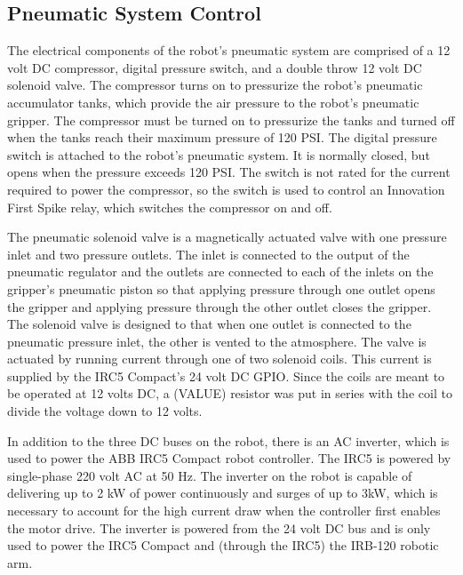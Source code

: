 \documentclass{cwru}
\begin{document}
\subsection[Pneumatic System Control]{Pneumatic System Control}
The electrical components of the robot{\textquoteright}s pneumatic system are comprised of a 12 volt DC compressor, digital pressure switch, and a double throw 12 volt DC solenoid valve. The compressor turns on to pressurize the robot{\textquoteright}s pneumatic accumulator tanks, which provide the air pressure to the robot{\textquoteright}s pneumatic gripper. The compressor must be turned on to pressurize the tanks and turned off when the tanks reach their maximum pressure of 120 PSI. The digital pressure switch is attached to the robot{\textquoteright}s pneumatic system. It is normally closed, but opens when the pressure exceeds 120 PSI. The switch is not rated for the current required to power the compressor, so the switch is used to control an Innovation First Spike relay, which switches the compressor on and off.

The pneumatic solenoid valve is a magnetically actuated valve with one pressure inlet and two pressure outlets. The inlet is connected to the output of the pneumatic regulator and the outlets are connected to each of the inlets on the gripper{\textquoteright}s pneumatic piston so that applying pressure through one outlet opens the gripper and applying pressure through the other outlet closes the gripper. The solenoid valve is designed to that when one outlet is connected to the pneumatic pressure inlet, the other is vented to the atmosphere. The valve is actuated by running current through one of two solenoid coils. This current is supplied by the IRC5 Compact{\textquoteright}s 24 volt DC GPIO. Since the coils are meant to be operated at 12 volts DC, a (VALUE) resistor was put in series with the coil to divide the voltage down to 12 volts.

In addition to the three DC buses on the robot, there is an AC inverter, which is used to power the ABB IRC5 Compact robot controller. The IRC5 is powered by single-phase 220 volt AC at 50 Hz. The inverter on the robot is capable of delivering up to 2 kW of power continuously and surges of up to 3kW, which is necessary to account for the high current draw when the controller first enables the motor drive. The inverter is powered from the 24 volt DC bus and is only used to power the IRC5 Compact and (through the IRC5) the IRB-120 robotic arm.
\end{document}
